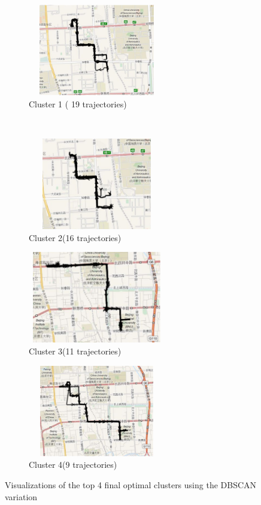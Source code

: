 \begin{figure}
    \centering
    \begin{subfigure}[t]{.5\textwidth}
        \centering
        \includegraphics[width=6cm,height=4cm,keepaspectratio]{figs/new/DBSCAN1.eps}
        \caption{Cluster 1 ( 19 trajectories)}
    \end{subfigure}%
    ~ 
    \begin{subfigure}[t]{.5\textwidth}
        \centering
        \includegraphics[width=6cm,height=4cm,keepaspectratio]{figs/new/DBSCAN2.eps}
        \caption{Cluster 2(16 trajectories)}
    \end{subfigure}
    
    \begin{subfigure}[t]{.5\textwidth}
        \centering
        \includegraphics[width=6cm,height=4cm,keepaspectratio]{figs/new/DBSCAN3.eps}
        \caption{Cluster 3(11 trajectories)}
    \end{subfigure}%
    \begin{subfigure}[t]{.5\textwidth}
        \centering
        \includegraphics[width=6cm,height=4cm,keepaspectratio]{figs/new/DBSCAN4.eps}
        \caption{Cluster 4(9 trajectories)}
    \end{subfigure}
    \caption{Visualizations of the top 4 final optimal clusters using the DBSCAN variation}
    \label{fig:DBSCANRes}
\end{figure}

